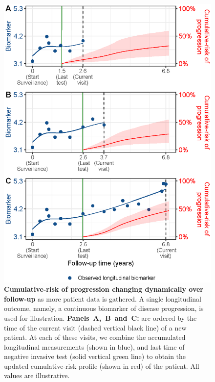 \begin{figure}
\centerline{\includegraphics{images/dynrisk_plot_102.eps}}
\caption{\textbf{Cumulative-risk of progression changing dynamically over follow-up} as more patient data is gathered. A single longitudinal outcome, namely, a continuous biomarker of disease progression, is used for illustration. \textbf{Panels~A,~B~and~C:} are ordered by the time of the current visit (dashed vertical black line) of a new patient. At each of these visits, we combine the accumulated longitudinal measurements (shown in blue), and last time of negative invasive test (solid vertical green line) to obtain the updated cumulative-risk profile (shown in red) of the patient. All values are illustrative.} 
\label{fig:dynrisk_explanation}
\end{figure}

